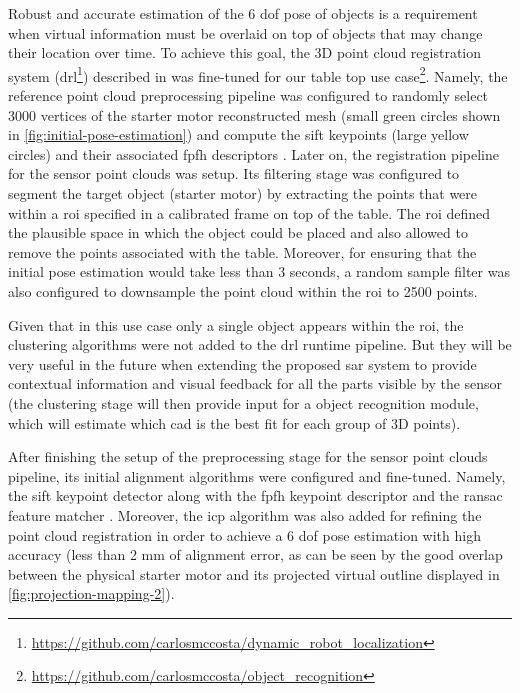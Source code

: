 Robust and accurate estimation of the 6 \gls{dof} pose of objects is a requirement when virtual information must be overlaid on top of objects that may change their location over time. To achieve this goal, the 3D point cloud registration system (drl\footnote{\url{https://github.com/carlosmccosta/dynamic_robot_localization}}) described in \cite{Costa2016} was fine-tuned for our table top use case\footnote{\url{https://github.com/carlosmccosta/object_recognition}}. Namely, the reference point cloud preprocessing pipeline was configured to randomly select 3000 vertices of the starter motor reconstructed mesh (small green circles shown in \cref{fig:initial-pose-estimation}) and compute the \gls{sift} keypoints \cite{Lowe2004} (large yellow circles) and their associated \gls{fpfh} descriptors \cite{Rusu2009}. Later on, the registration pipeline for the sensor point clouds was setup. Its filtering stage was configured to segment the target object (starter motor) by extracting the points that were within a \gls{roi} specified in a calibrated frame on top of the table. The \gls{roi} defined the plausible space in which the object could be placed and also allowed to remove the points associated with the table. Moreover, for ensuring that the initial pose estimation would take less than 3 seconds, a random sample filter was also configured to downsample the point cloud within the \gls{roi} to 2500 points.

Given that in this use case only a single object appears within the \gls{roi}, the clustering algorithms were not added to the drl runtime pipeline. But they will be very useful in the future when extending the proposed \gls{sar} system to provide contextual information and visual feedback for all the parts visible by the sensor (the clustering stage will then provide input for a object recognition module, which will estimate which \gls{cad} is the best fit for each group of 3D points).

After finishing the setup of the preprocessing stage for the sensor point clouds pipeline, its initial alignment algorithms were configured and fine-tuned. Namely, the \gls{sift} keypoint detector along with the \gls{fpfh} keypoint descriptor and the \gls{ransac} feature matcher \cite{Rusu2009}. Moreover, the \gls{icp} \cite{Besl1992a} algorithm was also added for refining the point cloud registration in order to achieve a 6 \gls{dof} pose estimation with high accuracy (less than 2 mm of alignment error, as can be seen by the good overlap between the physical starter motor and its projected virtual outline displayed in \cref{fig:projection-mapping-2}).

